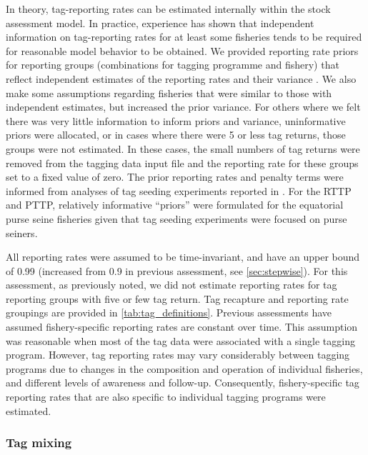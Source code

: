 In theory, tag-reporting rates can be estimated internally within the stock assessment model. In practice, experience has shown that independent information on tag-reporting rates for at least some fisheries tends to be required for reasonable model behavior to be obtained. We provided reporting rate priors for reporting groups (combinations for tagging programme and fishery) that reflect independent estimates of the reporting rates and their variance \citep{peatman_analysis_2023-2}. We also make some assumptions regarding fisheries that were similar to those with independent estimates, but increased the prior variance. For others where we felt there was very little information to inform priors and variance, uninformative priors were allocated, or in cases where there were 5 or less tag returns, those groups were not estimated. In these cases, the small numbers of tag returns were removed from the tagging data input file and the reporting rate for these groups set to a fixed value of zero. The prior reporting rates and penalty terms were informed from analyses of tag seeding experiments reported in \citet{peatman_analysis_2023-2}. For the RTTP and PTTP, relatively informative \enquote{priors} were formulated for the equatorial purse seine fisheries given that tag seeding experiments were focused on purse seiners.

All reporting rates were assumed to be time-invariant, and have an upper bound of 0.99 (increased from 0.9 in previous assessment, see \autoref{sec:stepwise}). For this assessment, as previously noted, we did not estimate reporting rates for tag reporting groups with five or few tag return. Tag recapture and reporting rate groupings are provided in \autoref{tab:tag_definitions}. Previous assessments have assumed fishery-specific reporting rates are constant over time. This assumption was reasonable when most of the tag data were associated with a single tagging program. However, tag reporting rates may vary considerably between tagging programs due to changes in the composition and operation of individual fisheries, and different levels of awareness and follow-up. Consequently, fishery-specific tag reporting rates that are also specific to individual tagging programs were estimated.

\subsubsection{Tag mixing}
\label{sec:tag_mixing}

